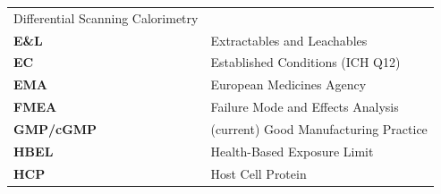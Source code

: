 \documentclass[
  11pt,
  a4paper,
]{report}
\begin{document}
\begin{longtable}[]{@{}ll@{}}
\begin{minipage}[t]{0.61\columnwidth}
Differential Scanning Calorimetry\strut
\end{minipage}\tabularnewline
\begin{minipage}[t]{0.33\columnwidth}\raggedright
\textbf{E\&L}\strut
\end{minipage} & \begin{minipage}[t]{0.61\columnwidth}\raggedright
Extractables and Leachables\strut
\end{minipage}\tabularnewline
\begin{minipage}[t]{0.33\columnwidth}\raggedright
\textbf{EC}\strut
\end{minipage} & \begin{minipage}[t]{0.61\columnwidth}\raggedright
Established Conditions (ICH Q12)\strut
\end{minipage}\tabularnewline
\begin{minipage}[t]{0.33\columnwidth}\raggedright
\textbf{EMA}\strut
\end{minipage} & \begin{minipage}[t]{0.61\columnwidth}\raggedright
European Medicines Agency\strut
\end{minipage}\tabularnewline
\begin{minipage}[t]{0.33\columnwidth}\raggedright
\textbf{FMEA}\strut
\end{minipage} & \begin{minipage}[t]{0.61\columnwidth}\raggedright
Failure Mode and Effects Analysis\strut
\end{minipage}\tabularnewline
\begin{minipage}[t]{0.33\columnwidth}\raggedright
\textbf{GMP/cGMP}\strut
\end{minipage} & \begin{minipage}[t]{0.61\columnwidth}\raggedright
(current) Good Manufacturing Practice\strut
\end{minipage}\tabularnewline
\begin{minipage}[t]{0.33\columnwidth}\raggedright
\textbf{HBEL}\strut
\end{minipage} & \begin{minipage}[t]{0.61\columnwidth}\raggedright
Health-Based Exposure Limit\strut
\end{minipage}\tabularnewline
\begin{minipage}[t]{0.33\columnwidth}\raggedright
\textbf{HCP}\strut
\end{minipage} & \begin{minipage}[t]{0.61\columnwidth}\raggedright
Host Cell Protein\strut
\end{minipage}\tabularnewline

\end{longtable}
\end{document}
